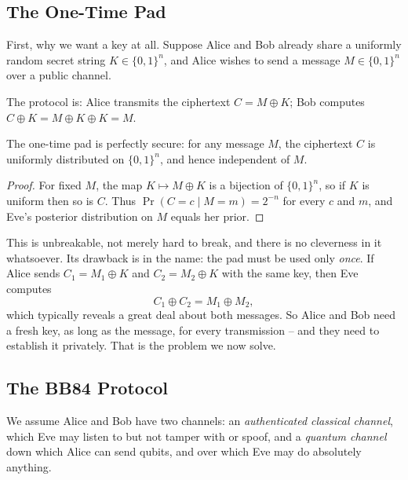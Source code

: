 \documentclass[a4paper]{scrartcl}
\begin{document}
\subsection{The One-Time Pad}

First, why we want a key at all. Suppose Alice and Bob already share a uniformly random secret string $K \in \{0,1\}^n$, and Alice wishes to send a message $M \in \{0,1\}^n$ over a public channel.

\begin{definition}
	The  protocol is: Alice transmits the ciphertext $C = M \oplus K$; Bob computes $C \oplus K = M \oplus K \oplus K = M$.
\end{definition}

\begin{proposition}
	The one-time pad is perfectly secure: for any message $M$, the ciphertext $C$ is uniformly distributed on $\{0,1\}^n$, and hence independent of $M$.
\end{proposition}

\begin{proof}
	For fixed $M$, the map $K \mapsto M\oplus K$ is a bijection of $\{0,1\}^n$, so if $K$ is uniform then so is $C$. Thus $\Pr(C = c \mid M = m) = 2^{-n}$ for every $c$ and $m$, and Eve's posterior distribution on $M$ equals her prior.
\end{proof}

This is unbreakable, not merely hard to break, and there is no cleverness in it whatsoever. Its drawback is in the name: the pad must be used only \emph{once}. If Alice sends $C_1 = M_1\oplus K$ and $C_2 = M_2\oplus K$ with the same key, then Eve computes
$$C_1\oplus C_2 = M_1\oplus M_2,$$
which typically reveals a great deal about both messages. So Alice and Bob need a fresh key, as long as the message, for every transmission -- and they need to establish it privately. That is the problem we now solve.

\subsection{The BB84 Protocol}\label{sec:bb84}

We assume Alice and Bob have two channels: an \emph{authenticated classical channel}, which Eve may listen to but not tamper with or spoof, and a \emph{quantum channel} down which Alice can send qubits, and over which Eve may do absolutely anything.
\end{document}
